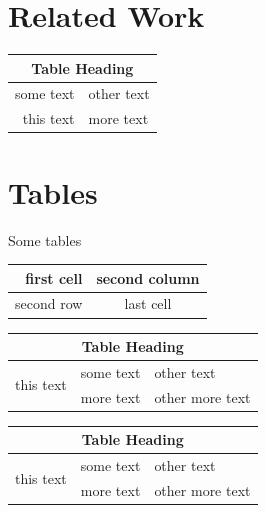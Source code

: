 \documentclass[12pt,twoside,a4paper]{article}
\begin{document}
\lipsum[1-4]

\section{Related Work}
\singlespacing

\lipsum[5-6]

\begin{table}[ht]

	\begin{tabular}{ | r | l | }
    	\hline
    	\multicolumn{2}{|c|}{Table Heading} \\
    	\hline
    		some text & other text \\
			this text & more text \\
    	\hline
	\end{tabular}

\end{table}

\lipsum[5-6]

\section{Tables}

Some tables

\vspace{0.2in}

\begin{tabular}{| r | c |}
\hline
first cell & second column \\
\hline
second row & last cell \\
\hline
\end{tabular}

\vspace{0.2in}




\vspace{0.2in}

\begin{tabular}{ | r | c | l | }
    \hline
    \multicolumn{3}{|c|}{Table Heading} \\
\hline
    \multirow{2}{*}{this text} & some text & other text \\
     & more text & other more text \\
    \hline
\end{tabular}

\vspace{0.2in}

\begin{tabularx}{\textwidth}{ | X | X | X | }
    \hline
    \multicolumn{3}{|c|}{Table Heading} \\
\hline
    \multirow{2}{*}{this text} & some text & other text \\
     & more text & other more text \\
    \hline
\end{tabularx}
\end{document}
